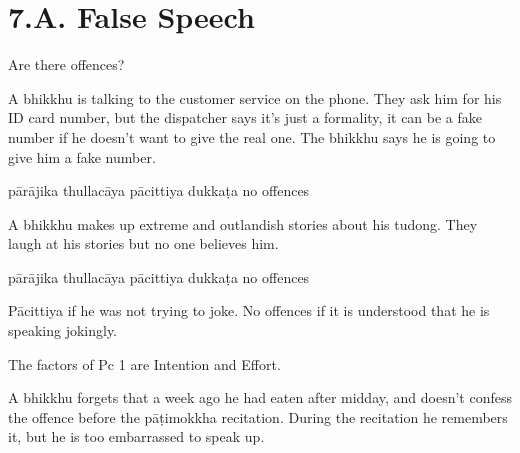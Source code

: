 \chapter{7.A. False Speech}
\renewcommand*{\theChapterTitle}{7.A. False Speech}

\begin{exam}{\autoExamName}

\begin{problem*}

Are there offences?

\begin{parts}

\item A bhikkhu is talking to the customer service on the phone. They ask him for
  his ID card number, but the dispatcher says it's just a formality, it can be a
  fake number if he doesn't want to give the real one. The bhikkhu says he is
  going to give him a fake number.

  \bigskip

  \begin{answers}{5}
    \bChoices
     pārājika\eAns
     thullacāya\eAns
     pācittiya\eAns
     dukkaṭa\eAns
     no offences\eAns
    \eChoices
  \end{answers}

  \bigskip

\item A bhikkhu makes up extreme and outlandish stories about his tudong. They
  laugh at his stories but no one believes him.

  \bigskip

  \begin{answers}{5}
    \bChoices
     pārājika\eAns
     thullacāya\eAns
     pācittiya\eAns
     dukkaṭa\eAns
     no offences\eAns
    \eChoices
  \end{answers}

  \begin{solution}
    Pācittiya if he was not trying to joke.
    No offences if it is understood that he is speaking jokingly.

    The factors of Pc 1 are Intention and Effort.
  \end{solution}

  \bigskip

\item A bhikkhu forgets that a week ago he had eaten after midday, and doesn't
  confess the offence before the pāṭimokkha recitation. During the recitation he
  remembers it, but he is too embarrassed to speak up.


\end{parts}
\end{problem*}
\end{exam}
